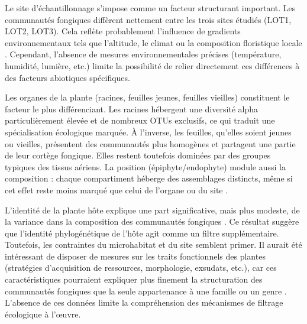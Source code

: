 \documentclass[a4paper,12pt]{article}
\begin{document}
Le site d’échantillonnage s’impose comme un facteur structurant important. Les communautés fongiques diffèrent nettement entre les trois sites étudiés (LOT1, LOT2, LOT3). Cela reflète probablement l’influence de gradients environnementaux tels que l’altitude, le climat ou la composition floristique locale \citep{tedersoo2014global,glassman2018decomposition}. Cependant, l’absence de mesures environnementales précises (température, humidité, lumière, etc.) limite la possibilité de relier directement ces différences à des facteurs abiotiques spécifiques.

Les organes de la plante (racines, feuilles jeunes, feuilles vieilles) constituent le facteur le  plus différenciant. Les racines hébergent une diversité alpha particulièrement élevée et de nombreux OTUs exclusifs, ce qui traduit une spécialisation écologique marquée. À l’inverse, les feuilles, qu’elles soient jeunes ou vieilles, présentent des communautés plus homogènes et partagent une partie de leur cortège fongique. Elles restent toutefois dominées par des groupes typiques des tissus aériens. La position (épiphyte/endophyte) module aussi la composition : chaque compartiment héberge des assemblages distincts, même si cet effet reste moins marqué que celui de l’organe ou du site \citep{rodriguez_fungal_2009}.

L’identité de la plante hôte explique une part significative, mais plus modeste, de la variance dans la composition des communautés fongiques \citep{kembel2014plant}. Ce résultat suggère que l’identité phylogénétique de l’hôte agit comme un filtre supplémentaire. Toutefois, les contraintes du microhabitat et du site semblent primer. Il aurait été intéressant de disposer de mesures sur les traits fonctionnels des plantes (stratégies d’acquisition de ressources, morphologie, exsudats, etc.), car ces caractéristiques pourraient expliquer plus finement la structuration des communautés fongiques que la seule appartenance à une famille ou un genre \citep{broeckling2008root}. L’absence de ces données limite la compréhension des mécanismes de filtrage écologique à l’œuvre.
\end{document}
